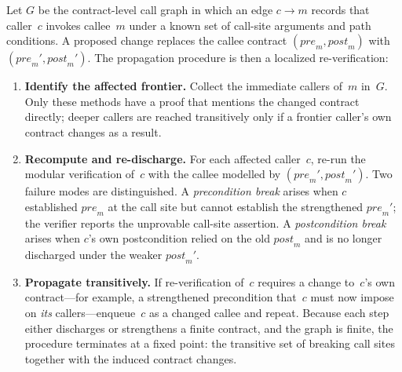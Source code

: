 Let $G$ be the contract-level call graph in which an edge $c \rightarrow m$
records that caller~$c$ invokes callee~$m$ under a known set of call-site
arguments and path conditions. A proposed change replaces the callee contract
$(\mathit{pre}_m, \mathit{post}_m)$ with $(\mathit{pre}_m',
\mathit{post}_m')$. The propagation procedure is then a localized
re-verification:

\begin{enumerate}
  \item \textbf{Identify the affected frontier.} Collect the immediate callers
  of~$m$ in~$G$. Only these methods have a proof that mentions the changed
  contract directly; deeper callers are reached transitively only if a frontier
  caller's own contract changes as a result.
  \item \textbf{Recompute and re-discharge.} For each affected caller~$c$,
  re-run the modular verification of~$c$ with the callee modelled by
  $(\mathit{pre}_m', \mathit{post}_m')$. Two failure modes are
  distinguished. A \emph{precondition break} arises when $c$ established
  $\mathit{pre}_m$ at the call site but cannot establish the strengthened
  $\mathit{pre}_m'$; the verifier reports the unprovable call-site assertion. A
  \emph{postcondition break} arises when $c$'s own postcondition relied on the
  old $\mathit{post}_m$ and is no longer discharged under the weaker
  $\mathit{post}_m'$.
  \item \textbf{Propagate transitively.} If re-verification of~$c$ requires a
  change to~$c$'s own contract---for example, a strengthened precondition
  that~$c$ must now impose on \emph{its} callers---enqueue~$c$ as a changed
  callee and repeat. Because each step either discharges or strengthens a finite
  contract, and the graph is finite, the procedure terminates at a fixed point:
  the transitive set of breaking call sites together with the induced contract
  changes.
\end{enumerate}

